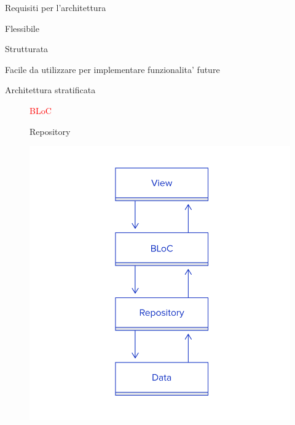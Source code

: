 \documentclass[12pt,italian,oneside]{report}
\newcommand{\rosso}[1]{\textcolor{red}{#1}}
\begin{document}
\begin{firstheadlineitemize}
	\item Requisiti per l'architettura
	\begin{secondheadlineitemize}
		\item Flessibile
		\item Strutturata
		\item Facile da utilizzare per implementare funzionalita' future
	\end{secondheadlineitemize}

	\item Architettura stratificata
	\begin{figure}[htp]
		\centering
		\hfill
		\begin{minipage}[b]{.3\columnwidth}
			\footnotesize
			\begin{secondheadlineitemize}
				\item \rosso{BLoC}
				\item Repository
			\end{secondheadlineitemize}
		\end{minipage}
		\begin{minipage}[c]{.5\columnwidth}
			\begin{center}
				\includegraphics[scale=0.25]{architettura_implementata}
			\end{center}
		\end{minipage}\hspace*{\fill}
	\end{figure}
\end{firstheadlineitemize}
\end{document}
